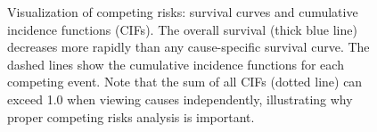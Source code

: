 \begin{figure}[htbp]
    \caption{Visualization of competing risks: survival curves and cumulative incidence functions (CIFs). The overall survival (thick blue line) decreases more rapidly than any cause-specific survival curve. The dashed lines show the cumulative incidence functions for each competing event. Note that the sum of all CIFs (dotted line) can exceed 1.0 when viewing causes independently, illustrating why proper competing risks analysis is important.}
    \label{fig:competing-risks}
\end{figure}